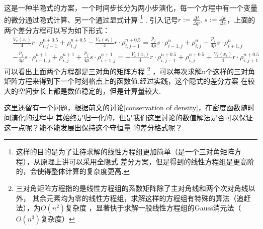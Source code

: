     这是一种半隐式的方案，一个时间步长分为两小步演化，每一个方程中有一个变量的微分通过隐式计算、另一个通过显式计算
    \footnote{
        这样的目的是为了让待求解的线性方程组更加简单（是一个三对角矩阵方程），从原理上讲可以采用全隐式
        差分方案，但是得到的线性方程组是更高阶的，会使得整体计算的复杂度更高.
    }
    .
    引入记号$r:=\frac{\Delta t}{\Delta p},\, s:=\frac{\Delta t}{\Delta x}$，上面的两个差分方程可以写为如下形式：
    \begin{equation}
        \begin{split}
            &\frac{V_{x}(x_{i})}{4}r\cdot\rho_{i,j-1}^{n+0.5} + \rho_{i,j}^{n+0.5} - \frac{V_{x}(x_{i})}{4}r\cdot\rho_{i,j+1}^{n+0.5} =
             \frac{p_{j}}{4\mu}s\cdot\rho_{i-1,j}^{n} + \rho_{i,j}^{n} - \frac{p_{j}}{4\mu}s\cdot\rho_{i+1,j}^{n} \\
            &- \frac{p_{j}}{4\mu}s\cdot\rho_{i-1,j}^{n+1} + \rho_{i,j}^{n+1} + \frac{p_{j}}{4\mu}s\cdot\rho_{i+1,j}^{n+1} =
            -\frac{V_{x}(x_{i})}{4}r\cdot\rho_{i,j-1}^{n+0.5} + \rho_{i,j}^{n+0.5} + \frac{V_{x}(x_{i})}{4}r\cdot\rho_{i,j+1}^{n+0.5}
        \end{split}
    \end{equation}
    可以看出上面两个方程都是三对角的矩阵方程
    \footnote{
        三对角矩阵方程指的是线性方程组的系数矩阵除了主对角线和两个次对角线以外，
        其余元素均为零的线性方程组，求解这样的方程组有特殊的算法（追赶法），为$O(n^2)$复杂度
        ，显著快于求解一般线性方程组的Gauss消元法（$O(n^3)$复杂度）
    }
    ，可以每次求解n个这样的三对角矩阵方程来得到下一个时刻格点上的函数值.经过实践，这个隐式的差分方案
    在较大的空间步长上都是数值稳定的，但是计算量较大.
    \par 
    这里还留有一个问题，根据前文的讨论\ref{conservation of density}，在密度函数随时间演化的过程中
    其始终是归一化的，但是我们这里讨论的数值解法是否可以保证这一点呢？能不能发展出保持这个守恒量
    的差分格式呢？

